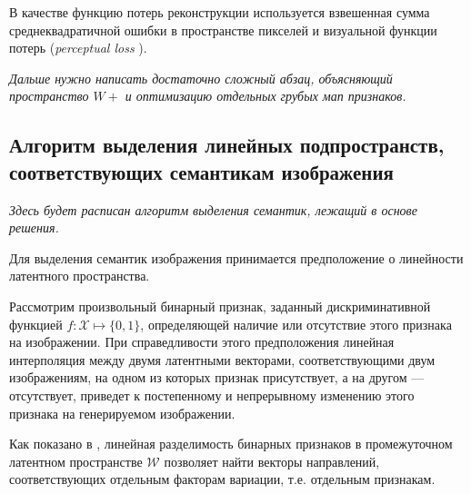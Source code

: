 В качестве функцию потерь реконструкции используется взвешенная сумма среднеквадратичной ошибки в пространстве пикселей и визуальной функции потерь (\emph{perceptual loss} \cite{Johnson2016Perceptual}).

\emph{Дальше нужно написать достаточно сложный абзац, объясняющий пространство $W+$ и оптимизацию отдельных грубых мап признаков.}


\subsection{Алгоритм выделения линейных подпространств, соответствующих семантикам изображения}
\emph{Здесь будет расписан алгоритм выделения семантик, лежащий в основе решения.}

Для выделения семантик изображения принимается предположение о линейности латентного пространства.

Рассмотрим произвольный бинарный признак, заданный дискриминативной функцией $f : \mathcal X \mapsto \{0,1\}$, определяющей наличие или отсутствие этого признака на изображении.
При справедливости этого предположения линейная интерполяция между двумя латентными векторами, соответствующими двум изображениям, на одном из которых признак присутствует, а на другом --- отсутствует, приведет к постепенному и непрерывному изменению этого признака на генерируемом изображении. 

Как показано в \cite{StyleGAN}, линейная разделимость бинарных признаков в промежуточном латентном пространстве $\mathcal{W}$ позволяет найти векторы направлений, соответствующих отдельным факторам вариации, т.е. отдельным признакам.

